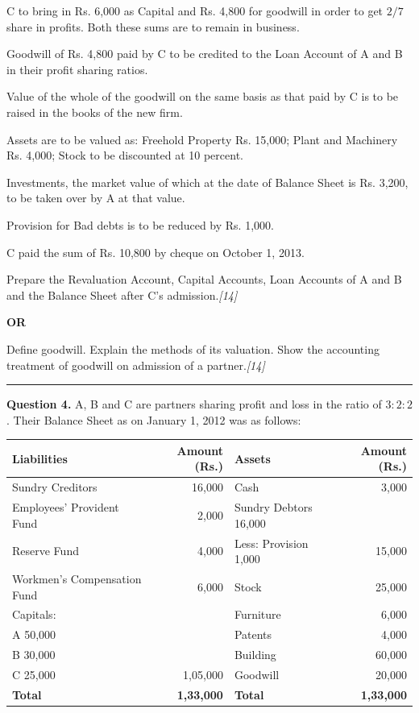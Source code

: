 \documentclass[11pt,a4paper]{article}
\newcommand{\pts}[1]{\hfill   \textit{[#1]}}
\begin{document}
\begin{parts}
  \item C to bring in Rs. 6,000 as Capital and Rs. 4,800 for goodwill in order to get $2/7$ share in profits. Both these sums are to remain in business.
  \item Goodwill of Rs. 4,800 paid by C to be credited to the Loan Account of A and B in their profit sharing ratios.
  \item Value of the whole of the goodwill on the same basis as that paid by C is to be raised in the books of the new firm.
  \item Assets are to be valued as: Freehold Property Rs. 15,000; Plant and Machinery Rs. 4,000; Stock to be discounted at 10 percent.
  \item Investments, the market value of which at the date of Balance Sheet is Rs. 3,200, to be taken over by A at that value.
  \item Provision for Bad debts is to be reduced by Rs. 1,000.
\end{parts}
C paid the sum of Rs. 10,800 by cheque on October 1, 2013.

Prepare the Revaluation Account, Capital Accounts, Loan Accounts of A and B and the Balance Sheet after C's admission.\pts{14}

\centerline{   \textbf{OR}}

Define goodwill. Explain the methods of its valuation. Show the accounting treatment of goodwill on admission of a partner.\pts{14}

\medskip\rule{\linewidth}{0.2pt}




\noindent   \textbf{Question 4.}
A, B and C are partners sharing profit and loss in the ratio of $3:2:2$. Their Balance Sheet as on January 1, 2012 was as follows:


\begin{center}
\small

\begin{tabular}{|l|r||l|r|}
\hline
   \textbf{Liabilities} &   \textbf{Amount (Rs.)} &   \textbf{Assets} &   \textbf{Amount (Rs.)} \\
\hline
Sundry Creditors & 16,000 & Cash & 3,000 \\
Employees' Provident Fund & 2,000 & Sundry Debtors \hfill 16,000 & \\
Reserve Fund & 4,000 & Less: Provision \hfill 1,000 & 15,000 \\
Workmen's Compensation Fund & 6,000 & Stock & 25,000 \\
Capitals: & & Furniture & 6,000 \\
\quad A \hfill 50,000 & & Patents & 4,000 \\
\quad B \hfill 30,000 & & Building & 60,000 \\
\quad C \hfill 25,000 & 1,05,000 & Goodwill & 20,000 \\
\hline
   \textbf{Total} &   \textbf{1,33,000} &   \textbf{Total} &   \textbf{1,33,000} \\
\hline
\end{tabular}
\end{center}
\end{document}
